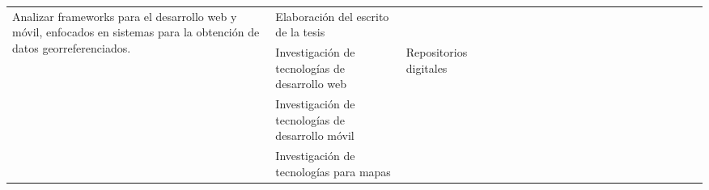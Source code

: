\begin{landscape}
\begin{ThreePartTable}
\begin{longtable}{|p{}|p{5.5cm}|p{4cm}|l|l|l|l|l|l|l|l|l|l|l|l|l|l|l|l|l|l|l|}
            \hline
            \multirow{6}{0.41\textwidth}{Analizar frameworks para el desarrollo web y móvil, enfocados en sistemas para la obtención
            de datos georreferenciados.}                                        & Elaboración del escrito de la tesis                                 &                                                                & \cellcolor{green!25}                  & \cellcolor{green!25}                  & \cellcolor{green!25}                 & \cellcolor{green!25}                  & \cellcolor{green!25} & \cellcolor{green!25} & \cellcolor{green!25} & \cellcolor{green!25} & \cellcolor{green!25} & \cellcolor{green!25} & \cellcolor{green!25} & \cellcolor{green!25} & \cellcolor{green!25} & \cellcolor{green!25} &                      \\
            \cline{2-2}\cline{4-21}
                                                                                & Investigación de tecnologías de desarrollo web                      & Repositorios digitales                                         & \cellcolor{green!25}                  &                                       &                                      &                                       &                      &                      &                      &                      &                      &                      &                      &                      &                      &                      &                      \\
            \cline{2-2}\cline{4-21}
                                                                                & Investigación de tecnologías de desarrollo móvil                    &                                                                & \cellcolor{green!25}                  &                                       &                                      &                                       &                      &                      &                      &                      &                      &                      &                      &                      &                      &                      &                      \\
            \cline{2-2}\cline{4-21}
                                                                                & Investigación de tecnologías para mapas                             &                                                                &                                       & \cellcolor{green!25}                  &                                      &                                       &                      &                      &                      &                      &                      &                      &                      &                      &                      &                      &                      \\

\end{longtable}
\end{ThreePartTable}
\end{landscape}
